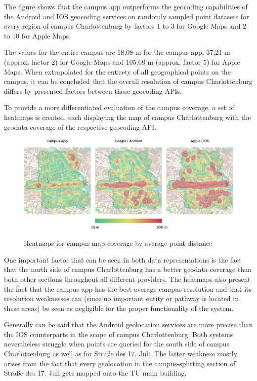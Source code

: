 The figure shows that the campus app outperforms the geocoding capabilities of the Android and IOS geocoding services on randomly sampled point datasets for every region of campus Charlottenburg by factors 1 to 3 for Google Maps and 2 to 10 for Apple Maps.

The values for the entire campus are 18,08 m for the campus app, 37,21 m (approx. factor 2) for Google Maps and 105,08 m (approx. factor 5) for Apple Maps. When extrapolated for the entirety of all geographical points on the campus, it can be concluded that the overall resolution of campus Charlottenburg differs by presented factors between those geocoding APIs.

\newpage

To provide a more differentiated evaluation of the campus coverage, a set of heatmaps is created, each displaying the map of campus Charlottenburg with the geodata coverage of the respective geocoding API.

\begin{figure}[H]
	\centering
	\includegraphics[width=1.0\textwidth]{images/heatmaps.png}\\
	\caption{Heatmaps for campus map coverage by average point distance}
\end{figure}

One important factor that can be seen in both data representations is the fact that the north side of campus Charlottenburg has a better geodata coverage than both other sections throughout all different providers. The heatmaps also present the fact that the campus app has the best average campus resolution and that its resolution weaknesses can (since no important entity or pathway is located in these areas) be seen as negligible for the proper functionality of the system.

Generally can be said that the Android geolocation services are more precise than the IOS counterparts in the scope of campus Charlottenburg. Both systems nevertheless struggle when points are queried for the south side of campus Charlottenburg as well as for Straße des 17. Juli. The latter weakness mostly arises from the fact that every geolocation in the campus-splitting section of Straße des 17. Juli gets mapped onto the TU main building.

